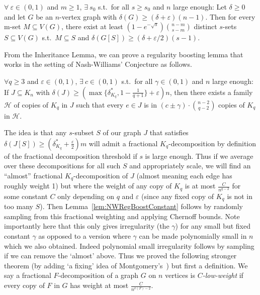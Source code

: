 \documentclass[twoside,leqno]{article}
\begin{document}
\begin{lem}\label{lem:LangInheritance}
$\forall~\varepsilon\in(0,1)$ and $m\geq 1$, $\exists~s_0$ s.t.~for all $s\geq s_0$ and $n$ large enough: Let $\delta\geq 0$ and let $G$ be an $n$-vertex graph with $\delta(G)\geq (\delta+\varepsilon)(n-1)$. Then for every m-set $M\subseteq V(G)$, there exist at least $(1-e^{-\sqrt{s}})\binom{n-m}{s-m}$ distinct $s$-sets $S\subseteq V(G)$ s.t.~$M\subseteq S$ and $\delta(G[S])\geq (\delta+\varepsilon/2)(s-1)$.
\end{lem}

From the Inheritance Lemma, we can prove a regularity boosting lemma that works in the setting of Nash-Williams' Conjecture as follows. 

\begin{lem}\label{lem:NWRegBoostConstant}
$\forall q\geq 3$ and $\varepsilon \in (0,1)$, $\exists~c\in(0,1)$ s.t.~for all $\gamma\in (0,1)$ and $n$ large enough: If $J\subseteq K_n$ with $\delta(J)\ge (\max\{\delta_{K_q}^*,1-\frac{1}{q+1}\}+\varepsilon)n$, then there exists a family $\mathcal{H}$ of copies of $K_q$ in $J$ such that every $e\in J$ is in $(c\pm \gamma)\cdot \binom{n-2}{q-2}$ copies of $K_q$ in $\mathcal{H}$.
\end{lem}

The idea is that any $s$-subset $S$ of our graph $J$ that satisfies $\delta(J[S]) \ge (\delta_{K_q}^*+\frac{\varepsilon}{2})m$ will admit a fractional $K_q$-decomposition by definition of the fractional decomposition threshold if $s$ is large enough. Thus if we average over these decompositions for all such $S$ and appropriately scale, we will find an ``almost'' fractional $K_q$-decomposition of $J$ (almost meaning each edge has roughly weight 1) but where the weight of any copy of $K_q$ is at most $\frac{C}{n^{q-2}}$ for some constant $C$ only depending on $q$ and $\varepsilon$ (since any fixed copy of $K_q$ is not in too many $S$). Then Lemma~\ref{lem:NWRegBoostConstant} follows by randomly sampling from this fractional weighting and applying Chernoff bounds. Note importantly here that this only gives irregularity (the $\gamma$) for any small but fixed constant $\gamma$ as opposed to a version where $\gamma$ can be made polynomially small in $n$ which we also obtained. Indeed polynomial small irregularity follows by sampling if we can remove the `almost' above. Thus we proved the following stronger theorem (by adding `a fixing' idea of Montgomery's~\cite{montgomery_fractional_2019}) but first a definition. We say a fractional $F$-decomposition of a graph $G$ on $n$ vertices is \emph{$C$-low-weight} if every copy of $F$ in $G$ has weight at most $\frac{C}{n^{v(F)-2}}$. 
\end{document}

